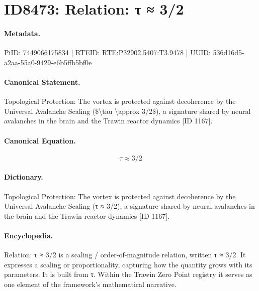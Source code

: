 \section*{ID8473: Relation: τ ≈ 3/2}
\paragraph{Metadata.}
PiID: 7449066175834 | RTEID: RTE:P32902.5407:T3.9478 | UUID: 536d16d5-a2aa-55a0-9429-e6b5ffb5bf0e

\paragraph{Canonical Statement.}
Topological Protection: The vortex is protected against decoherence by the Universal Avalanche Scaling (\$\textbackslash{}tau \textbackslash{}approx 3/2\$), a signature shared by neural avalanches in the brain and the Trawin reactor dynamics [ID 1167].

\paragraph{Canonical Equation.}
\[
\tau \approx 3/2
\]

\paragraph{Dictionary.}
Topological Protection: The vortex is protected against decoherence by the Universal Avalanche Scaling (τ ≈ 3/2), a signature shared by neural avalanches in the brain and the Trawin reactor dynamics [ID 1167].

\paragraph{Encyclopedia.}
Relation: τ ≈ 3/2 is a scaling / order-of-magnitude relation, written τ ≈ 3/2. It expresses a scaling or proportionality, capturing how the quantity grows with its parameters. It is built from τ. Within the Trawin Zero Point registry it serves as one element of the framework's mathematical narrative.
